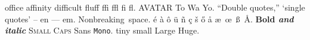\documentclass{article}
\begin{document}
office affinity difficult fluff ffi ffl fi fl. AVATAR To Wa Yo.
``Double quotes,'' `single quotes' -- en --- em. Nonbreaking~space.
\'e \`a \^o \"u \~n \c c \v s \H o \r a \ae\ \oe\ \ss\ \AA.
\textbf{Bold \textit{and italic}} \textsc{Small Caps} \textsf{Sans} \texttt{Mono}.
{\tiny tiny} {\small small} {\Large Large} {\Huge Huge}.
\end{document}
